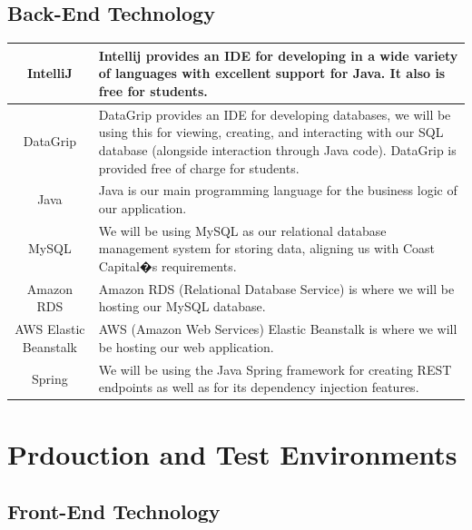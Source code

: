 \documentclass[11pt, titlepage]{article}
\begin{document}
\clearpage

\subsection{Back-End Technology}

\begin{center}
        \begin{table}[!htbp]
        \centering
        \begin{tabularx}{\linewidth}{|| c || L ||}
    \hline
    IntelliJ & Intellij provides an IDE for developing in a wide variety of languages with excellent support for Java. It also is free for students. \\
    \hline
    DataGrip & DataGrip provides an IDE for developing databases, we will be using this for viewing, creating, and interacting with our SQL database (alongside interaction through Java code). DataGrip is provided free of charge for students.\\
    \hline
    Java & Java is our main programming language for the business logic of our application. \\
    \hline
    MySQL & We will be using MySQL as our relational database management system for storing data, aligning us with Coast Capital�s requirements.\\
    \hline
    Amazon RDS & Amazon RDS (Relational Database Service) is where we will be hosting our MySQL database. \\
    \hline
    AWS Elastic Beanstalk & AWS (Amazon Web Services) Elastic Beanstalk is where we will be hosting our web application. \\
    \hline
    Spring & We will be using the Java Spring framework for creating REST endpoints as well as for its dependency injection features. \\
    \hline
    \end{tabularx}
    \end{table}
\end{center}

\clearpage

\section{Prdouction and Test Environments}

\subsection{Front-End Technology}
\end{document}
